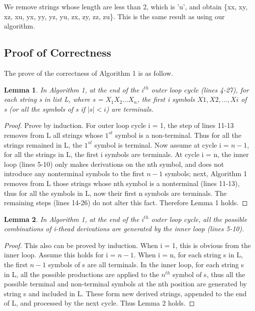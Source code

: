 \documentclass{sig-alternate-05-2015}
\newtheorem{lemma}{Lemma}
\begin{document}
We remove strings whose length are less than 2, which is 'u', and obtain \{xx, xy, xz, xu, yx, yy, yz, yu, zx, zy, zz,
zu\}. This is the same result as using our algorithm.


\subsection{Proof of Correctness}
The prove of the correctness of Algorithm 1 is as follow.

\begin{lemma}
In Algorithm 1, at the end of the $i^{th}$ outer
loop cycle (lines 4-27), for each string s in list L, where s =
$X_1X_2…X_n$, the first i symbols $X1, X2, …, Xi$ of s (or all the
symbols of s if $\mid s \mid < i$) are terminals.
\end{lemma}
\begin{proof}
Prove by induction. For outer loop cycle i = 1, the
step of lines 11-13 removes from L all strings whose $1^{st}$
symbol is a non-terminal. Thus for all the strings remained
in L, the $1^{st}$ symbol is terminal. Now assume at cycle i =
 $n-1$, for all the strings in L, the first i symbols are terminals.
At cycle i = n, the inner loop (lines 5-10) only makes derivations
on the nth symbol, and does not introduce any nonterminal
symbols to the first $n-1$ symbols; next, Algorithm
1 removes from L those strings whose nth symbol is a nonterminal
(lines 11-13), thus for all the symbols in L, now
their first n symbols are terminals. The remaining steps
(lines 14-26) do not alter this fact. Therefore Lemma 1
holds.
\end{proof}

\begin{lemma}
In Algorithm 1, at the end of the $i^{th}$ outer
loop cycle, all the possible combinations of i-thead derivations
are generated by the inner loop (lines 5-10).
\end{lemma}
\begin{proof}
This also can be proved by induction. When i = 1,
this is obvious from the inner loop. Assume this holds for i
= $n-1$. When i = n, for each string s in L, the first $n-1$ symbols
of s are all terminals. In the inner loop, for each string
s in L, all the possible productions are applied to the $n^{th}$
symbol of s, thus all the possible terminal and non-terminal
symbols at the nth position are generated by string s and
included in L. These form new derived strings, appended to
the end of L, and processed by the next cycle. Thus Lemma
2 holds.
\end{proof}
\end{document}
